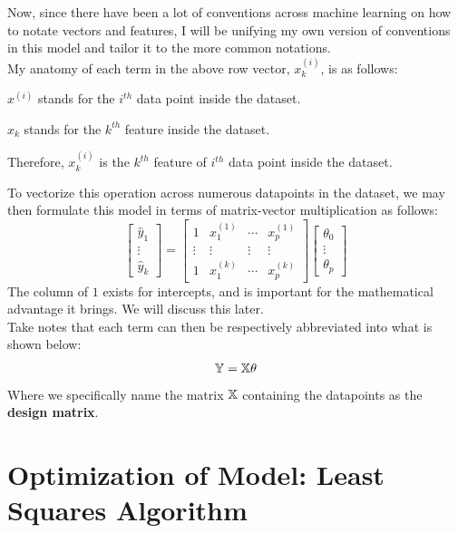 Now, since there have been a lot of conventions across machine learning on how to notate vectors and features, I will be unifying my own version of conventions in this model and tailor it to the more common notations. \\
My anatomy of each term in the above row vector, $x_k^{(i)}$, is as follows:
\begin{bindenum}
    \item $x^{(i)}$ stands for the $i^{th}$ data point inside the dataset.
    \item $x_k$ stands for the $k^{th}$ feature inside the dataset.
    \item Therefore, $x_k^{(i)}$ is the $k^{th}$ feature of $i^{th}$ data point inside the dataset.
\end{bindenum}
To vectorize this operation across numerous datapoints in the dataset, we may then formulate this model in terms of matrix-vector multiplication as follows:
\[
    \begin{bmatrix} \hat{y}_1 \\ \vdots \\ \hat{y}_k \end{bmatrix} =
    \begin{bmatrix} 
        1 & x_1^{(1)} & \cdots & x_p^{(1)} \\
        \vdots & \vdots & \vdots & \vdots \\
        1 & x_1^{(k)} & \cdots & x_p^{(k)}
    \end{bmatrix}
    \begin{bmatrix} \theta_0 \\ \vdots \\ \theta_p \end{bmatrix}
\]
The column of $1$ exists for intercepts, and is important for the mathematical advantage it brings. We will discuss this later. \\
Take notes that each term can then be respectively abbreviated into what is shown below:
\[\mathbb{Y} = \mathbb{X} \theta\]
Where we specifically name the matrix $\mathbb{X}$ containing the datapoints as the \textbf{design matrix}.

\section{Optimization of Model: Least Squares Algorithm}

